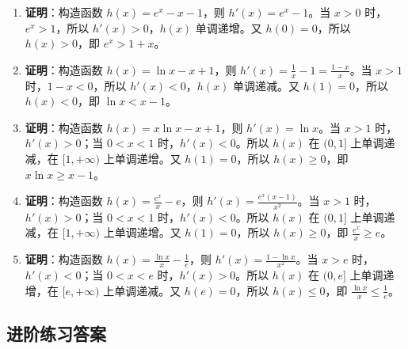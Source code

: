 \documentclass[a4paper,11pt]{ctexrep}
\theoremstyle{definition}
\begin{document}
\begin{enumerate}
    \item \textbf{证明}：构造函数 $h(x) = e^x - x - 1$，则 $h'(x) = e^x - 1$。当 $x > 0$ 时，$e^x > 1$，所以 $h'(x) > 0$，$h(x)$ 单调递增。又 $h(0) = 0$，所以 $h(x) > 0$，即 $e^x > 1 + x$。
    
    \item \textbf{证明}：构造函数 $h(x) = \ln x - x + 1$，则 $h'(x) = \frac{1}{x} - 1 = \frac{1-x}{x}$。当 $x > 1$ 时，$1-x < 0$，所以 $h'(x) < 0$，$h(x)$ 单调递减。又 $h(1) = 0$，所以 $h(x) < 0$，即 $\ln x < x - 1$。
    
    \item \textbf{证明}：构造函数 $h(x) = x\ln x - x + 1$，则 $h'(x) = \ln x$。当 $x > 1$ 时，$h'(x) > 0$；当 $0 < x < 1$ 时，$h'(x) < 0$。所以 $h(x)$ 在 $(0, 1]$ 上单调递减，在 $[1, +\infty)$ 上单调递增。又 $h(1) = 0$，所以 $h(x) \geq 0$，即 $x\ln x \geq x - 1$。
    
    \item \textbf{证明}：构造函数 $h(x) = \frac{e^x}{x} - e$，则 $h'(x) = \frac{e^x(x-1)}{x^2}$。当 $x > 1$ 时，$h'(x) > 0$；当 $0 < x < 1$ 时，$h'(x) < 0$。所以 $h(x)$ 在 $(0, 1]$ 上单调递减，在 $[1, +\infty)$ 上单调递增。又 $h(1) = 0$，所以 $h(x) \geq 0$，即 $\frac{e^x}{x} \geq e$。
    
    \item \textbf{证明}：构造函数 $h(x) = \frac{\ln x}{x} - \frac{1}{e}$，则 $h'(x) = \frac{1 - \ln x}{x^2}$。当 $x > e$ 时，$h'(x) < 0$；当 $0 < x < e$ 时，$h'(x) > 0$。所以 $h(x)$ 在 $(0, e]$ 上单调递增，在 $[e, +\infty)$ 上单调递减。又 $h(e) = 0$，所以 $h(x) \leq 0$，即 $\frac{\ln x}{x} \leq \frac{1}{e}$。
\end{enumerate}

\subsection{进阶练习答案}
\end{document}
